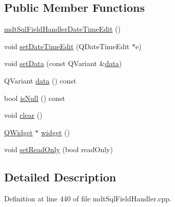 \subsection*{Public Member Functions}
\begin{DoxyCompactItemize}
\item 
\hyperlink{classmdt_sql_field_handler_date_time_edit_acff0584329bcaf54021c3871f55489ff}{mdt\-Sql\-Field\-Handler\-Date\-Time\-Edit} ()
\item 
void \hyperlink{classmdt_sql_field_handler_date_time_edit_a5dcf4efa976260c9200600cb543b9c6a}{set\-Date\-Time\-Edit} (Q\-Date\-Time\-Edit $\ast$e)
\item 
void \hyperlink{classmdt_sql_field_handler_date_time_edit_aa835f3e71815263ce8ffeaed54c02c94}{set\-Data} (const Q\-Variant \&\hyperlink{classmdt_sql_field_handler_date_time_edit_a540d33aa5707f981fd9e9784e87ab65d}{data})
\item 
Q\-Variant \hyperlink{classmdt_sql_field_handler_date_time_edit_a540d33aa5707f981fd9e9784e87ab65d}{data} () const 
\item 
bool \hyperlink{classmdt_sql_field_handler_date_time_edit_a69007cfe2aa93a1cdff190c4f968608f}{is\-Null} () const 
\item 
void \hyperlink{classmdt_sql_field_handler_date_time_edit_ad571aec159f1c1bd0def6346a60b866e}{clear} ()
\item 
\hyperlink{class_q_widget}{Q\-Widget} $\ast$ \hyperlink{classmdt_sql_field_handler_date_time_edit_a7a88cc728d8b3ccae1f90d78b617de88}{widget} ()
\item 
void \hyperlink{classmdt_sql_field_handler_date_time_edit_a8b67482f1d4ae5c0807becb05f602c6c}{set\-Read\-Only} (bool read\-Only)
\end{DoxyCompactItemize}


\subsection{Detailed Description}


Definition at line 440 of file mdt\-Sql\-Field\-Handler.\-cpp.



